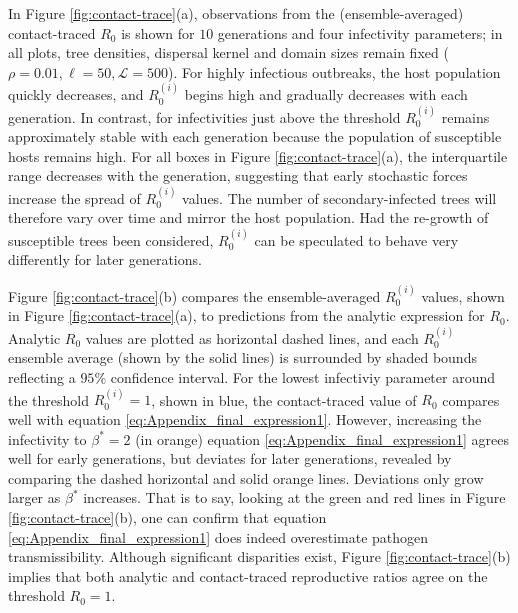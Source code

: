 In Figure \ref{fig:contact-trace}(a), observations from the (ensemble-averaged) contact-traced $R_0$ is shown for $10$ generations and 
four infectivity parameters; in all plots, tree densities, dispersal kernel and domain sizes remain fixed ($\rho=0.01, \ell=50, \mathcal{L}=500$).
For highly infectious outbreaks, the host population quickly decreases, and $R^{(i)}_0$ begins high and gradually decreases with each generation.
In contrast, for infectivities just above the threshold $R^{(i)}_0$ remains approximately stable with each generation because the population of susceptible hosts remains high.  
For all boxes in Figure \ref{fig:contact-trace}(a), the interquartile range decreases with the generation, suggesting that early stochastic forces increase the spread of $R^{(i)}_0$ values.
The number of secondary-infected trees will therefore vary over time and mirror the host population.
Had the re-growth of susceptible trees been considered, $R^{(i)}_0$ can be speculated to behave very differently for later generations.


Figure \ref{fig:contact-trace}(b) compares the ensemble-averaged $R^{(i)}_0$ values, shown in Figure \ref{fig:contact-trace}(a),
to predictions from the analytic expression for $R_0$.
Analytic $R_0$ values are plotted as horizontal dashed lines, and each $R_0^{(i)}$ ensemble average (shown by the solid lines) is surrounded by shaded bounds reflecting a $95\%$ confidence interval.
For the lowest infectiviy parameter around the threshold $R^{(i)}_0=1$, shown in blue, the contact-traced value of $R_0$ compares well with equation \ref{eq:Appendix_final_expression1}.
However, increasing the infectivity to $\beta^*=2$ (in orange) equation \ref{eq:Appendix_final_expression1} agrees well for early generations, but deviates for later generations, 
revealed by comparing the dashed horizontal and solid orange lines.
Deviations only grow larger as $\beta^*$ increases.
That is to say, looking at the green and red lines in Figure \ref{fig:contact-trace}(b), one can confirm that equation \ref{eq:Appendix_final_expression1} does indeed overestimate pathogen transmissibility.
Although significant disparities exist, Figure \ref{fig:contact-trace}(b) implies that both analytic and contact-traced reproductive ratios agree on the threshold $R_0=1$.

